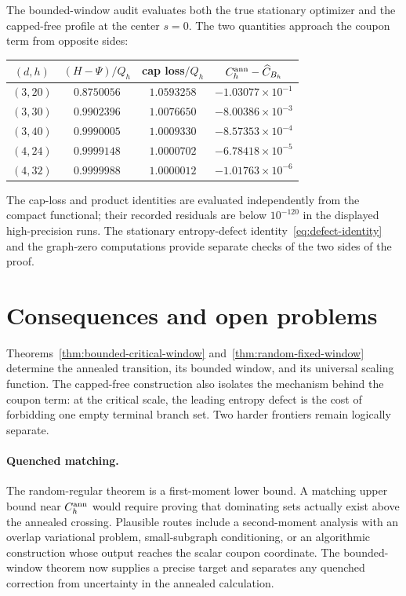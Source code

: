 \documentclass[11pt]{amsart}
\theoremstyle{definition}
\begin{document}
The bounded-window audit evaluates both the true stationary optimizer and the capped-free profile at the center $s=0$.  The two quantities approach the coupon term from opposite sides:
\begin{center}
\begin{tabular}{cccc}
\toprule
$(d,h)$ & $(H-\Psi)/Q_h$ & cap loss$/Q_h$ & $C_h^{\rm ann}-\widehat C_{B_h}$\\
\midrule
$(3,20)$ & $0.8750056$ & $1.0593258$ & $-1.03077\times10^{-1}$\\
$(3,30)$ & $0.9902396$ & $1.0076650$ & $-8.00386\times10^{-3}$\\
$(3,40)$ & $0.9990005$ & $1.0009330$ & $-8.57353\times10^{-4}$\\
$(4,24)$ & $0.9999148$ & $1.0000702$ & $-6.78418\times10^{-5}$\\
$(4,32)$ & $0.9999988$ & $1.0000012$ & $-1.01763\times10^{-6}$\\
\bottomrule
\end{tabular}
\end{center}
The cap-loss and product identities are evaluated independently from the compact functional; their recorded residuals are below $10^{-120}$ in the displayed high-precision runs.  The stationary entropy-defect identity~\eqref{eq:defect-identity} and the graph-zero computations provide separate checks of the two sides of the proof.

\section{Consequences and open problems}\label{sec:open}
Theorems~\ref{thm:bounded-critical-window} and~\ref{thm:random-fixed-window} determine the annealed transition, its bounded window, and its universal scaling function.  The capped-free construction also isolates the mechanism behind the coupon term: at the critical scale, the leading entropy defect is the cost of forbidding one empty terminal branch set.  Two harder frontiers remain logically separate.

\paragraph{Quenched matching.}
The random-regular theorem is a first-moment lower bound.  A matching upper bound near $C_h^{\rm ann}$ would require proving that dominating sets actually exist above the annealed crossing.  Plausible routes include a second-moment analysis with an overlap variational problem, small-subgraph conditioning, or an algorithmic construction whose output reaches the scalar coupon coordinate.  The bounded-window theorem now supplies a precise target and separates any quenched correction from uncertainty in the annealed calculation.
\end{document}
